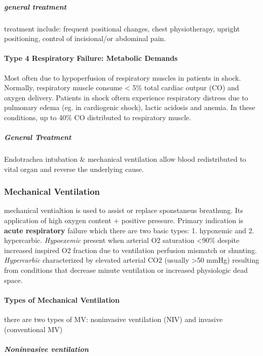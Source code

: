 \documentclass[
  letterpaper,
  DIV=11,
  numbers=noendperiod]{scrreprt}
\let\oldparagraph\paragraph
\renewcommand{\paragraph}[1]{\oldparagraph{#1}\mbox{}}
\let\oldsubparagraph\subparagraph
\renewcommand{\subparagraph}[1]{\oldsubparagraph{#1}\mbox{}}
\begin{document}
\subparagraph{general treatment}\label{general-treatment-2}

treatment include: frequent positional changes, chest physiotherapy,
upright positioning, control of incisional/or abdominal pain.

\paragraph{Type 4 Respiratory Failure: Metabolic
Demands}\label{type-4-respiratory-failure-metabolic-demands}

Most often due to hypoperfusion of respiratory muscles in patients in
shock. Normally, respiratory muscle consume \textless{} 5\% total
cardiac outpur (CO) and oxygen delivery. Patients in shock oftern
experience respiratory distress due to pulmonary edema (eg. in
cardiogenic shock), lactic acidosis and anemia. In these conditions, up
to 40\% CO distributed to respiratory muscle.

\subparagraph{General Treatment}\label{general-treatment-3}

Endotrachea intubation \& mechanical ventilation allow blood
redistributed to vital organ and reverse the underlying cause.

\subsubsection{Mechanical Ventilation}\label{mechanical-ventilation}

mechanical ventialtion is used to assist or replace sponstaneus
breathung. Its application of high oxygen content + positive pressure.
Primary indication is \textbf{acute respiratory} failure which there are
two basic types: 1. hypoxemic and 2. hypercarbic. \emph{Hypoexemic}
present when arterial O2 saturation \textless90\% despite increased
inspired O2 fraction due to ventilation perfusion mismatch or shunting.
\emph{Hypercarbic} characterized by elevated arterial CO2 (usually
\textgreater50 mmHg) resulting from conditions that decrease minute
ventilation or increased physiologic dead space.

\paragraph{Types of Mechanical
Ventilation}\label{types-of-mechanical-ventilation}

there are two types of MV: noninvasive ventilation (NIV) and invasive
(conventional MV)

\subparagraph{Noninvasive ventilation}\label{noninvasive-ventilation}
\end{document}
